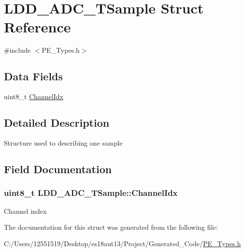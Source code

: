 \hypertarget{struct_l_d_d___a_d_c___t_sample}{}\section{L\+D\+D\+\_\+\+A\+D\+C\+\_\+\+T\+Sample Struct Reference}
\label{struct_l_d_d___a_d_c___t_sample}


{\ttfamily \#include $<$P\+E\+\_\+\+Types.\+h$>$}

\subsection*{Data Fields}
\begin{DoxyCompactItemize}
\item 
uint8\+\_\+t \hyperlink{struct_l_d_d___a_d_c___t_sample_ae2737bdf799311a9bc9f7acf30f569c1}{Channel\+Idx}
\end{DoxyCompactItemize}


\subsection{Detailed Description}
Structure used to describing one sample 

\subsection{Field Documentation}
\hypertarget{struct_l_d_d___a_d_c___t_sample_ae2737bdf799311a9bc9f7acf30f569c1}{}
\subsubsection[{Channel\+Idx}]{\setlength{\rightskip}{0pt plus 5cm}uint8\+\_\+t L\+D\+D\+\_\+\+A\+D\+C\+\_\+\+T\+Sample\+::\+Channel\+Idx}\label{struct_l_d_d___a_d_c___t_sample_ae2737bdf799311a9bc9f7acf30f569c1}
Channel index 

The documentation for this struct was generated from the following file\+:\begin{DoxyCompactItemize}
\item 
C\+:/\+Users/12551519/\+Desktop/es18aut13/\+Project/\+Generated\+\_\+\+Code/\hyperlink{_p_e___types_8h}{P\+E\+\_\+\+Types.\+h}\end{DoxyCompactItemize}

